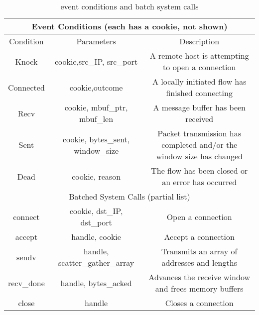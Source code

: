 \begin{table*}[t]
\centering
\begin{small}
\begin{tabular}{|c|c|c|}
\hline
\multicolumn{3}{|c|}{Event Conditions (each has a cookie, not shown)} \\
\hline
Condition &           Parameters  &                             Description\\
\hline
Knock  &               cookie,src\_IP, src\_port &                        A remote host is attempting to open a connection \\
Connected &            cookie,outcome  &                                  A locally initiated flow has finished connecting\\
Recv &                 cookie, mbuf\_ptr, mbuf\_len &                  A message buffer has been received\\
Sent &                 cookie, bytes\_sent, window\_size &          Packet transmission has completed and/or the window size has changed \\
Dead &                cookie, reason &                                    The flow has been closed or an error has occurred \\
\hline
\hline
\multicolumn{3}{|c|}{Batched System Calls (partial list)} \\
\hline
connect &            cookie, dst\_IP, dst\_port &            Open a connection\\
accept &               handle, cookie &                          Accept a connection\\
sendv &               handle, scatter\_gather\_array &      Transmits an array of addresses and lengths\\
recv\_done &          handle, bytes\_acked &                Advances the receive window and frees memory buffers\\
close &                 handle &                                      Closes a connection\\
\hline
\end{tabular}
\caption{\ix event conditions and batch system calls}
\label{tbl:api}
\end{small}
\end{table*}

